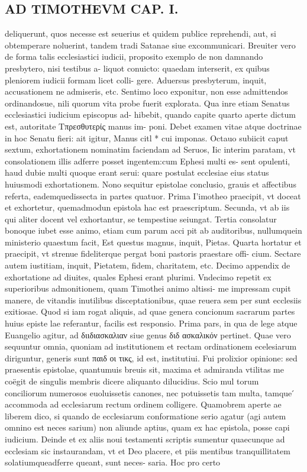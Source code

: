 \documentclass{article}
\begin{document}
\begin{pages}
\section*{AD TIMOTHEVM CAP. I. }
\marginpar{[ p.3 ]}\pstart deliquerunt, quos necesse est seuerius et quidem publice reprehendi, aut, si obtemperare noluerint, tandem tradi Satanae siue excommunicari. Breuiter vero de forma talis ecclesiastici iudicii, proposito exemplo de non damnando presbytero, nisi testibus a- liquot conuicto: quaedam interserit, ex quibus pleniorem iudicii formam licet colli- gere. Aduersus presbyterum, inquit, accusationem ne admiseris, etc.  \pend\pstart Sentimo loco exponitur, non esse admittendos ordinandosue, nili quorum vita probe fuerit explorata. Qua inre etiam Senatus ecclesiastici iudicium episcopus ad- hibebit, quando capite quarto aperte dictum est, autoritate Τπρεσθυτερίς manus im- poni. Debet examen vitae atque  doctrinae in hoc Senatu fieri: ait igitur, Manus citl * cui imponas.  \pend\pstart Octauo subiicit caput sextum, exhortationem nominatim faciendam ad Seruos, Iic interim paratam, vt consolationem illis adferre posset ingentem:cum Ephesi multi es- sent opulenti, haud dubie multi quoque  erant serui: quare postulat ecclesiae eius status huiusmodi exhortationem.  \pend\pstart Nono sequitur epistolae conclusio, grauis et affectibus referta, eademquedissecta in partes quatuor. Prima I’imotheo praecipit, vt doceat et exhortetur, quemadmodun epistola hac est praescriptum. Secunda, vt ab iis qui aliter docent vel exhortantur, se tempestiue seiungat. Tertia consolatur bonoque  iubet esse animo, etiam cum parum acci pit ab auditoribus, nullumquein ministerio quaestum facit, Est questus magnus, inquit, Pietas. Quarta hortatur et praecipit, vt strenue fideliterque  pergat boni pastoris praestare offi- cium. Sectare autem iustitiam, inquit, Pietatem, fidem, charitatem, etc.  \pend\pstart Decimo appendix de exhortatione ad diuites, quales Ephesi erant plurimi. Vndecimo repetit ex superioribus admonitionem, quam Timothei animo altissi- me impressam cupit manere, de vitandis inutilibus disceptationibus, quae reuera sem per sunt ecclesiis exitiosae.  \pend\pstart Quod si iam rogat aliquis, ad quae genera concionum sacrarum partes huius episte lae referantur, facilis est responsio. Prima pars, in qua de lege atque  Euangelio agitur, ad διιδιασκαλιαν siue genus διδ ασκαλικόν pertinet. Quae vero sequuntur omnia, quoniam ad institutionem et rectam ordinationem ecelesiarum diriguntur, generis sunt παιδ οι τικς, id est, institutiui.  \pend\pstart Fui prolixior opinione: sed praesentis epistolae, quantumuis breuis sit, maxima et admiranda vtilitas me coëgit de singulis membris dicere aliquanto dilucidius. Scio mul torum conciliorum numerosos euoluissetis canones, nec potuissetis tam multa, tamque ́ accommoda ad ecclesiarum rectum ordinem colligere. Quamobrem aperte ae liberem dico, si quando de ecclesiarum conformatione serio agatur (agi autem omnino est neces sarium) non aliunde aptius, quam ex hac epistola, posse capi iudicium. Deinde et ex aliis noui testamenti scriptis sumentur quaecunque  ad ecclesiam sic instaurandam, vt et Deo placere, et piis mentibus tranquillitatem solatiumqueadferre queant, sunt neces- saria. Hoc pro certo 
\end{pages}
\end{document}

